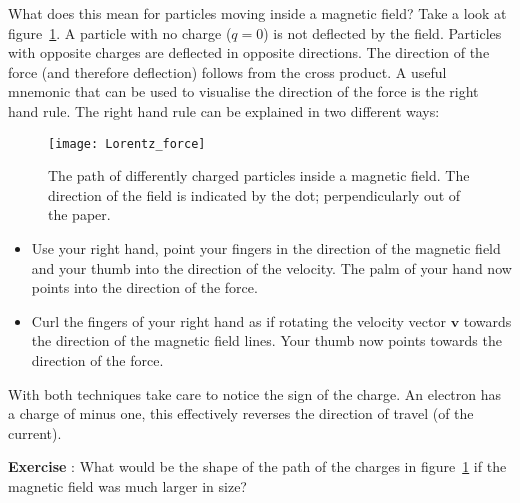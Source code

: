 What does this mean for particles moving inside a magnetic field? Take a look at figure~\ref{fig:lorentz}. A particle with no charge ($q=0$) is not deflected by the field. Particles with opposite charges are deflected in opposite directions. The direction of the force (and therefore deflection) follows from the cross product. A useful mnemonic that can be used to visualise the direction of the force is the right hand rule. The right hand rule can be explained in two different ways:
\begin{figure}\begin{center}
\texttt{[image: Lorentz\_force]}%
\caption{The path of differently charged particles inside a magnetic field. The direction of the field is indicated by the dot; perpendicularly out of the paper.} \label{fig:lorentz}
\end{center}\end{figure}
\begin{itemize}
\item Use your right hand, point your fingers in the direction of the magnetic field and your thumb into the direction of the velocity. The palm of your hand now points into the direction of the force.
\item Curl the fingers of your right hand as if rotating the velocity vector $\mathbf{v}$ towards the direction of the magnetic field lines. Your thumb now points towards the direction of the force.
\end{itemize}
With both techniques take care to notice the sign of the charge. An electron has a charge of minus one, this effectively reverses the direction of travel (of the current).

\begin{shaded}
\textbf{Exercise \theExercise {}} : What would be the shape of the path of the charges in figure~\ref{fig:lorentz} if the magnetic field was much larger in size?\end{shaded}

